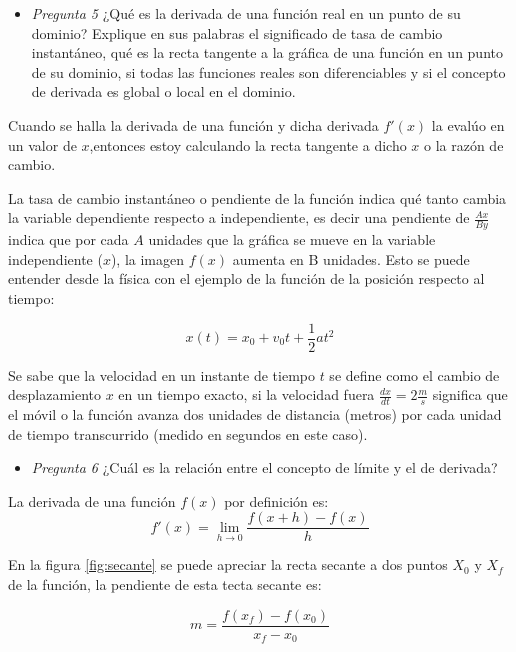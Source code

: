 \begin{itemize}
    \item \textit{Pregunta 5} ¿Qué es la derivada de una función real en un punto de su dominio? Explique en sus palabras el significado de tasa de cambio instantáneo, qué es la recta tangente a la gráfica de una función en un punto de su dominio, si todas las funciones reales son diferenciables y si el concepto de derivada es global o local en el dominio.
\end{itemize}

Cuando se halla la derivada de una función y dicha derivada $f'(x)$ la evalúo en un valor de $x$,entonces estoy calculando la recta tangente a dicho $x$ o la razón de cambio.

La tasa de cambio instantáneo o pendiente de la función indica qué tanto cambia la variable dependiente respecto a independiente, es decir una pendiente de $\frac{Ax}{By}$ indica que por cada $A$ unidades que la gráfica se mueve en la variable independiente ($x$), la imagen $f(x)$ aumenta en B unidades. Esto se puede entender desde la física con el ejemplo de la función de la posición respecto al tiempo:

\begin{equation}
    x(t) = x_0 + v_0 t + \frac{1}{2} a t^2
    \label{eq:movimiento_variado}
\end{equation}

Se sabe que la velocidad en un instante de tiempo $t$ se define como el cambio de desplazamiento $x$ en un tiempo exacto, si la velocidad fuera $\frac{dx}{dt} = 2 \frac{m}{s}$ significa que el móvil o la función avanza dos unidades de distancia (metros) por cada unidad de tiempo transcurrido (medido en segundos en este caso).

\begin{itemize}
    \item \textit{Pregunta 6} ¿Cuál es la relación entre el concepto de límite y el de derivada?
\end{itemize}

La derivada de una función $f(x)$ por definición es:
\begin{equation}
    f'(x) = \lim_{{h \to 0}} \frac{f(x+h) - f(x)}{h}
    \label{eq:derivada}
\end{equation}

En la figura \ref{fig:secante} se puede apreciar la recta secante a dos puntos $X_0$ y $X_f$ de la función, la pendiente de esta tecta secante es:

\begin{equation}
    m = \frac{f(x_f) - f(x_0)}{x_f - x_0}
    \label{eq:pendiente_secante}
\end{equation}

